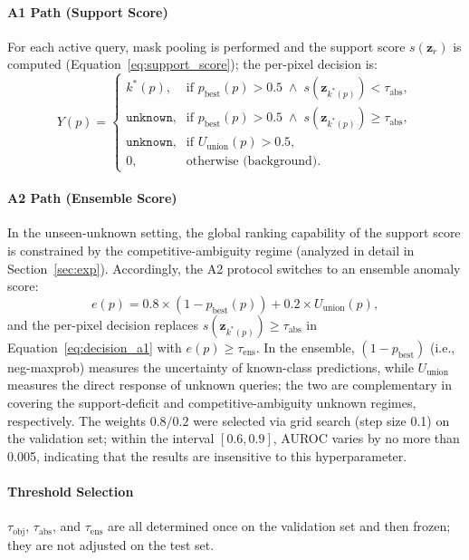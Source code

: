 \documentclass[3p,twocolumn,authoryear]{elsarticle}
\newcommand{\bz}{\mathbf{z}}                              %
\newcommand{\tobj}{\tau_{\text{obj}}}                     %
\newcommand{\tabs}{\tau_{\text{abs}}}                     %
\newcommand{\tens}{\tau_{\text{ens}}}                     %
\begin{document}
\paragraph{A1 Path (Support Score)}
For each active query, mask pooling is performed and the support score $s(\bz_r)$
is computed (Equation~\eqref{eq:support_score}); the per-pixel decision is:
\begin{equation}\label{eq:decision_a1}
  Y(p) = \begin{cases}
    k^*(p),           & \text{if } p_{\text{best}}(p) > 0.5 \;\wedge\; s(\bz_{k^*(p)}) < \tabs, \\
    \texttt{unknown}, & \text{if } p_{\text{best}}(p) > 0.5 \;\wedge\; s(\bz_{k^*(p)}) \geq \tabs, \\
    \texttt{unknown}, & \text{if } U_{\text{union}}(p) > 0.5, \\
    0,                & \text{otherwise (background)}.
  \end{cases}
\end{equation}

\paragraph{A2 Path (Ensemble Score)}
In the unseen-unknown setting, the global ranking capability of the support score
is constrained by the competitive-ambiguity regime (analyzed in detail in
Section~\ref{sec:exp}).
Accordingly, the A2 protocol switches to an ensemble anomaly score:
\begin{equation}\label{eq:ensemble}
  e(p) = 0.8 \times \left(1 - p_{\text{best}}(p)\right) + 0.2 \times U_{\text{union}}(p),
\end{equation}
and the per-pixel decision replaces $s(\bz_{k^*(p)}) \geq \tabs$ in
Equation~\eqref{eq:decision_a1} with $e(p) \geq \tens$.
In the ensemble, $(1 - p_{\text{best}})$ (i.e., neg-maxprob) measures the uncertainty
of known-class predictions, while $U_{\text{union}}$ measures the direct response of
unknown queries; the two are complementary in covering the support-deficit and
competitive-ambiguity unknown regimes, respectively.
The weights $0.8/0.2$ were selected via grid search (step size 0.1) on the validation
set; within the interval $[0.6, 0.9]$, AUROC varies by no more than 0.005,
indicating that the results are insensitive to this hyperparameter.

\paragraph{Threshold Selection}
$\tobj$, $\tabs$, and $\tens$ are all determined once on the validation set and then
frozen; they are not adjusted on the test set.
\end{document}

